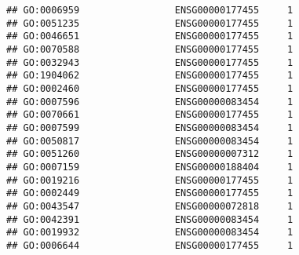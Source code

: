 \documentclass[
]{article}
\begin{document}
\begin{verbatim}
## GO:0006959                 ENSG00000177455     1
## GO:0051235                 ENSG00000177455     1
## GO:0046651                 ENSG00000177455     1
## GO:0070588                 ENSG00000177455     1
## GO:0032943                 ENSG00000177455     1
## GO:1904062                 ENSG00000177455     1
## GO:0002460                 ENSG00000177455     1
## GO:0007596                 ENSG00000083454     1
## GO:0070661                 ENSG00000177455     1
## GO:0007599                 ENSG00000083454     1
## GO:0050817                 ENSG00000083454     1
## GO:0051260                 ENSG00000007312     1
## GO:0007159                 ENSG00000188404     1
## GO:0019216                 ENSG00000177455     1
## GO:0002449                 ENSG00000177455     1
## GO:0043547                 ENSG00000072818     1
## GO:0042391                 ENSG00000083454     1
## GO:0019932                 ENSG00000083454     1
## GO:0006644                 ENSG00000177455     1
\end{verbatim}
\end{document}
